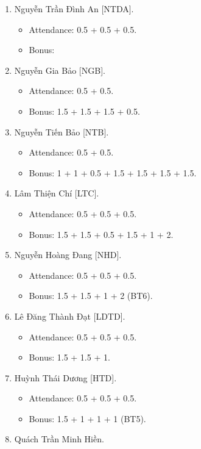 \documentclass{article}
\begin{document}
\begin{enumerate}
    \item {\sc Nguyễn Trần Đình An [NTDA].}
    \begin{itemize}
        \item Attendance: 0.5 + 0.5 + 0.5.
        \item Bonus:
    \end{itemize}
    \item {\sc Nguyễn Gia Bảo [NGB].}
    \begin{itemize}
        \item Attendance: 0.5 + 0.5.
        \item Bonus: 1.5 + 1.5 + 1.5 + 0.5.
    \end{itemize}
    \item {\sc Nguyễn Tiến Bảo [NTB].}
    \begin{itemize}
        \item Attendance: 0.5 + 0.5.
        \item Bonus: 1 + 1 + 0.5 + 1.5 + 1.5 + 1.5 + 1.5.
    \end{itemize}
    \item {\sc Lâm Thiện Chí [LTC].}
    \begin{itemize}
        \item Attendance: 0.5 + 0.5 + 0.5.
        \item Bonus: 1.5 + 1.5 + 0.5 + 1.5 + 1 + 2.
    \end{itemize}
    \item {\sc Nguyễn Hoàng Đang [NHD].}
    \begin{itemize}
        \item Attendance: 0.5 + 0.5 + 0.5.
        \item Bonus: 1.5 + 1.5 + 1 + 2 (BT6).
    \end{itemize}
    \item {\sc Lê Đăng Thành Đạt [LDTD].}
    \begin{itemize}
        \item Attendance: 0.5 + 0.5 + 0.5.
        \item Bonus: 1.5 + 1.5 + 1.
    \end{itemize}
    \item {\sc Huỳnh Thái Dương [HTD].}
    \begin{itemize}
        \item Attendance: 0.5 + 0.5 + 0.5.
        \item Bonus: 1.5 + 1 + 1 + 1 (BT5).
    \end{itemize}
    \item {\sc Quách Trần Minh Hiền.}

\end{enumerate}
\end{document}
